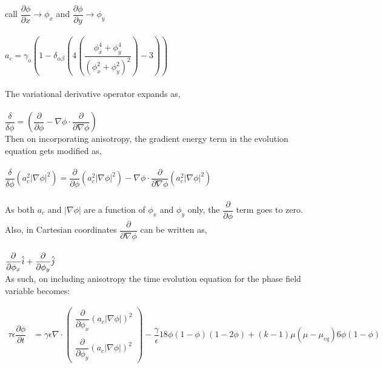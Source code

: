 \documentclass[12pt,a4paper]{report}
\begin{document}
\\
call $ \dfrac{\partial \phi}{\partial x} \rightarrow \phi_x $ and $\dfrac{\partial \phi}{\partial y} \rightarrow \phi_y$\\
\\
$a_c = \gamma_o\left(1 - \delta_{\alpha\beta}\left(4\left(\dfrac{\phi_x^4 + \phi_y^4}{\left(
\phi_x^2 + \phi_y^2\right)^2}\right)
 - 3\right)\right)$\\
\\
The variational derivative operator expands as, \\
\\
$\dfrac{\delta}{\delta\phi} = \left(\dfrac{\partial}{\partial\phi} -
 \nabla\phi\cdot\dfrac{\partial}{\partial\nabla\phi}\right)$
\\
Then on incorporating anisotropy, the gradient energy term in the evolution equation 
gets modified as, \\
\\
$\dfrac{\delta}{\delta\phi}\left(a_c^2|\nabla\phi|^2\right) = 
 \dfrac{\partial}{\partial\phi}\left(a_c^2|\nabla\phi|^2\right) -
 \nabla\phi\cdot\dfrac{\partial}{\partial\nabla\phi}\left(a_c^2|\nabla\phi|^2\right)
$\\
\\
As both $a_c$ and $|\nabla\phi|$ are a function of $\phi_x$ and $\phi_y$ only,
the $\dfrac{\partial}{\partial\phi}$ term goes to zero. Also, in Cartesian 
coordinates $\dfrac{\partial}{\partial\nabla\phi}$ can be written as,\\
\\
$\dfrac{\partial}{\partial\phi_x}\hat{i}+\dfrac{\partial}{\partial\phi_y}\hat{j}\\
$
\\
As such, on including anisotropy the time evolution equation for the phase field variable becomes: 

\begin{align}
\tau\epsilon\dfrac{\partial\phi}{\partial t} &= \gamma\epsilon\nabla\cdot
\begin{pmatrix}
	\dfrac{\partial}{\partial \phi_x}\left(a_c|\nabla\phi|\right)^2\\
	\\
	\dfrac{\partial}{\partial \phi_y}\left(a_c|\nabla\phi|\right)^2
\end{pmatrix}
-\dfrac{\gamma}{\epsilon}18\phi(1-\phi)(1-2\phi) +(k - 1)\mu\left(\mu-\mu_{eq}\right)6\phi\left(1-\phi\right)
\label{phi_evolution_aniso}
\end{align}
\end{document}
